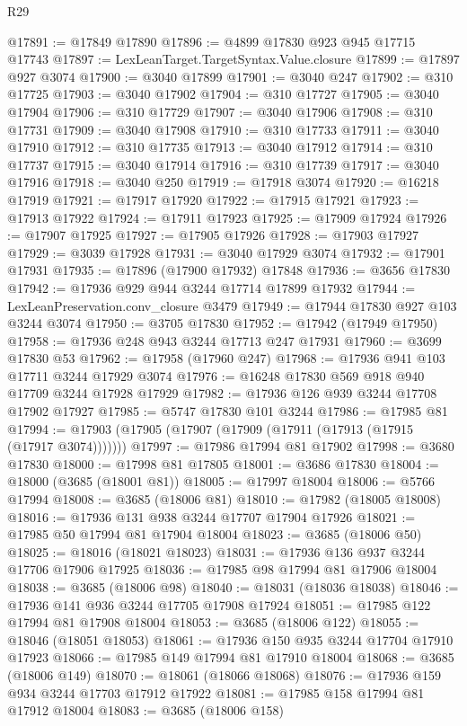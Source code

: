 \begin{lexlean}{R29}
\begin{coremodule}
@17891 := @17849 @17890
@17896 := @4899 @17830 @923 @945 @17715 @17743
@17897 := LexLeanTarget.TargetSyntax.Value.closure
@17899 := @17897 @927 @3074
@17900 := @3040 @17899
@17901 := @3040 @247
@17902 := @310 @17725
@17903 := @3040 @17902
@17904 := @310 @17727
@17905 := @3040 @17904
@17906 := @310 @17729
@17907 := @3040 @17906
@17908 := @310 @17731
@17909 := @3040 @17908
@17910 := @310 @17733
@17911 := @3040 @17910
@17912 := @310 @17735
@17913 := @3040 @17912
@17914 := @310 @17737
@17915 := @3040 @17914
@17916 := @310 @17739
@17917 := @3040 @17916
@17918 := @3040 @250
@17919 := @17918 @3074
@17920 := @16218 @17919
@17921 := @17917 @17920
@17922 := @17915 @17921
@17923 := @17913 @17922
@17924 := @17911 @17923
@17925 := @17909 @17924
@17926 := @17907 @17925
@17927 := @17905 @17926
@17928 := @17903 @17927
@17929 := @3039 @17928
@17931 := @3040 @17929 @3074
@17932 := @17901 @17931
@17935 := @17896 (@17900 @17932) @17848
@17936 := @3656 @17830
@17942 := @17936 @929 @944 @3244 @17714 @17899 @17932
@17944 := LexLeanPreservation.conv_closure @3479
@17949 := @17944 @17830 @927 @103 @3244 @3074
@17950 := @3705 @17830
@17952 := @17942 (@17949 @17950)
@17958 := @17936 @248 @943 @3244 @17713 @247 @17931
@17960 := @3699 @17830 @53
@17962 := @17958 (@17960 @247)
@17968 := @17936 @941 @103 @17711 @3244 @17929 @3074
@17976 := @16248 @17830 @569 @918 @940 @17709 @3244 @17928 @17929
@17982 := @17936 @126 @939 @3244 @17708 @17902 @17927
@17985 := @5747 @17830 @101 @3244
@17986 := @17985 @81
@17994 := @17903 (@17905 (@17907 (@17909 (@17911 (@17913 (@17915 (@17917 @3074)))))))
@17997 := @17986 @17994 @81 @17902
@17998 := @3680 @17830
@18000 := @17998 @81 @17805
@18001 := @3686 @17830
@18004 := @18000 (@3685 (@18001 @81))
@18005 := @17997 @18004
@18006 := @5766 @17994
@18008 := @3685 (@18006 @81)
@18010 := @17982 (@18005 @18008)
@18016 := @17936 @131 @938 @3244 @17707 @17904 @17926
@18021 := @17985 @50 @17994 @81 @17904 @18004
@18023 := @3685 (@18006 @50)
@18025 := @18016 (@18021 @18023)
@18031 := @17936 @136 @937 @3244 @17706 @17906 @17925
@18036 := @17985 @98 @17994 @81 @17906 @18004
@18038 := @3685 (@18006 @98)
@18040 := @18031 (@18036 @18038)
@18046 := @17936 @141 @936 @3244 @17705 @17908 @17924
@18051 := @17985 @122 @17994 @81 @17908 @18004
@18053 := @3685 (@18006 @122)
@18055 := @18046 (@18051 @18053)
@18061 := @17936 @150 @935 @3244 @17704 @17910 @17923
@18066 := @17985 @149 @17994 @81 @17910 @18004
@18068 := @3685 (@18006 @149)
@18070 := @18061 (@18066 @18068)
@18076 := @17936 @159 @934 @3244 @17703 @17912 @17922
@18081 := @17985 @158 @17994 @81 @17912 @18004
@18083 := @3685 (@18006 @158)

\end{coremodule}
\end{lexlean}
